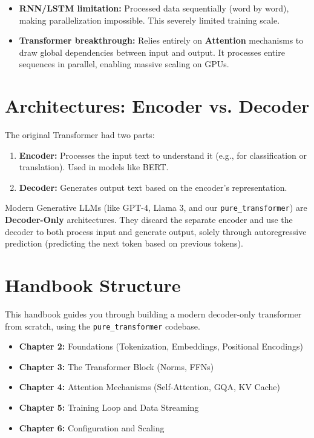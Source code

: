 \begin{itemize}
    \item \textbf{RNN/LSTM limitation:} Processed data sequentially (word by word), making parallelization impossible. This severely limited training scale.
    \item \textbf{Transformer breakthrough:} Relies entirely on \textbf{Attention} mechanisms to draw global dependencies between input and output. It processes entire sequences in parallel, enabling massive scaling on GPUs.
\end{itemize}

\section{Architectures: Encoder vs. Decoder}
The original Transformer had two parts:
\begin{enumerate}
    \item \textbf{Encoder:} Processes the input text to understand it (e.g., for classification or translation). Used in models like BERT.
    \item \textbf{Decoder:} Generates output text based on the encoder's representation.
\end{enumerate}

Modern Generative LLMs (like GPT-4, Llama 3, and our \texttt{pure\_transformer}) are \textbf{Decoder-Only} architectures. They discard the separate encoder and use the decoder to both process input and generate output, solely through autoregressive prediction (predicting the next token based on previous tokens).

\section{Handbook Structure}
This handbook guides you through building a modern decoder-only transformer from scratch, using the \texttt{pure\_transformer} codebase.

\begin{itemize}
    \item \textbf{Chapter 2:} Foundations (Tokenization, Embeddings, Positional Encodings)
    \item \textbf{Chapter 3:} The Transformer Block (Norms, FFNs)
    \item \textbf{Chapter 4:} Attention Mechanisms (Self-Attention, GQA, KV Cache)
    \item \textbf{Chapter 5:} Training Loop and Data Streaming
    \item \textbf{Chapter 6:} Configuration and Scaling
\end{itemize}
